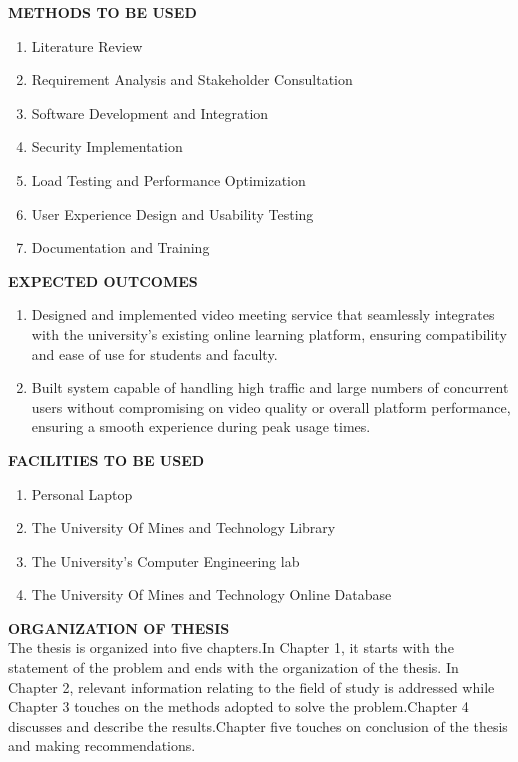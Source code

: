 \documentclass[12pt,a4paper]{report}
\begin{document}
		\textbf{METHODS TO BE USED}
		\begin{enumerate}[a]
			\item {Literature Review}
			\item{Requirement Analysis and Stakeholder Consultation}
			\item{Software Development and Integration}
			\item {Security Implementation}
			\item{Load Testing and Performance Optimization}
			\item{User Experience Design and Usability Testing}
			\item{Documentation and Training}
		\end{enumerate}
		\newpage
		\textbf{EXPECTED OUTCOMES }\\
		\begin{enumerate}[a]
		\item{
			Designed and implemented video meeting service that seamlessly integrates with the university's existing online learning platform, ensuring compatibility and ease of use for students and faculty.}
		\item{
			Built system capable of handling high traffic and large numbers of concurrent users without compromising on video quality or overall platform performance, ensuring a smooth experience during peak usage times.}


		\end{enumerate}
		\textbf{FACILITIES TO BE USED }\\
		\begin{enumerate}[a]
			\item {Personal Laptop}
			\item{The University Of Mines and Technology Library}
			\item {The University's Computer Engineering lab}
			\item{The University Of Mines and Technology Online Database}

		\end{enumerate}
		\textbf{ORGANIZATION OF THESIS}\\
		The thesis is organized into five chapters.In Chapter 1, it starts with the statement of the problem and ends with the organization of the thesis. In Chapter 2, relevant information relating to the field of study is addressed while Chapter 3 touches on the methods adopted to solve the problem.Chapter 4 discusses and describe the results.Chapter five touches on conclusion of the thesis and making recommendations.
\end{document}
